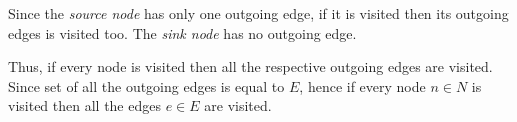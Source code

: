 Since the \emph{source node} has only one outgoing edge, if it is visited then its outgoing edges is visited too. The \emph{sink node} has no outgoing edge.

Thus, if every node is visited then all the respective outgoing edges are visited. Since set of all the outgoing edges is equal to $E$, hence if every node $n \in N$ is visited then all the edges $e \in E$ are visited.



 